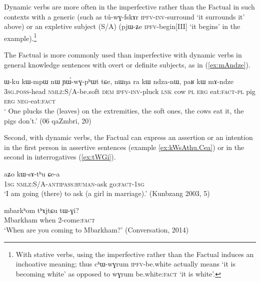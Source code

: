 \documentclass[oldfontcommands,oneside,a4paper,11pt]{article}
\newcommand{\ipa}[1]{{\phon \mbox{#1}}} %
\newcommand{\refb}[1]{(\ref{#1})}
\newcommand{\factual}[1]{\textsc{:fact}}
\begin{document}
 Dynamic verbs are more often in the imperfective rather than the Factual in such contexts with a generic (such as \ipa{tú-wɣ-fskɤr}  \textsc{ipfv-inv}-surround  `it surrounds it' above)  or an expletive subject (S/A) (\ipa{pjɯ-ʑe} \textsc{ipfv}-begin[III] `it begins' in the example).\footnote{With stative verbs, using the imperfective rather than the Factual induces an inchoative meaning; thus \ipa{cʰɯ-wɣrum} \textsc{ipfv}-be.white actually means `it is becoming white' as opposed to \ipa{wɣrum} be.white\factual{} `it is white'.}
 
 The Factual is more commonly used than imperfective with dynamic verbs in general knowledge sentences with overt or definite subjects, as in \refb{ex:mAndze}.  

\begin{exe}
\ex \label{ex:mAndze}
\gll
   	\ipa{ɯ-ku}  	\ipa{kɯ-mpɯ}  	\ipa{nɯ}  	\ipa{ɲɯ́-wɣ-pʰɯt}  	\ipa{tɕe,}  \ipa{nɯŋa}  	\ipa{ra}  	\ipa{kɯ}  	\ipa{ndza-nɯ,}  	\ipa{paʁ}  	\ipa{kɯ}  	\ipa{mɤ-ndze}   \\
\textsc{3sg.poss}-head \textsc{nmlz}:S/A-be.soft \textsc{dem} \textsc{ipfv-inv}-pluck \textsc{lnk} cow \textsc{pl} \textsc{erg} eat:\textsc{fact-pl} pig \textsc{erg} \textsc{neg}-eat\factual{} \\
\glt ` One plucks the (leaves) on the extremities, the soft ones, the cows eat it, the pigs don't.' (06 qaZmbri, 20)
\end{exe}

 
Second, with dynamic verbs, the Factual can express an assertion or an intention in the first person in assertive sentences (example \ref{ex:kWsAthu.Cea}) or in the second in interrogatives (\ref{ex:tWGi}).

\begin{exe}
\ex \label{ex:kWsAthu.Cea}
\gll
\ipa{aʑo}  	\ipa{kɯ-sɤ-tʰu}  	\ipa{ɕe-a}  \\
\textsc{1sg} \textsc{nmlz}:S/A-\textsc{antipass:human}-ask go\factual{}-\textsc{1sg} \\
\glt `I am going (there) to ask (a girl in marriage).' (Kunbzang 2003, 5)
\end{exe}

\begin{exe}
\ex \label{ex:tWGi}
\gll
\ipa{mbarkʰom} \ipa{tʰɤjtɕu} \ipa{tɯ-ɣi}?\\
Mbarkham when 2-come\factual{} \\
\glt `When are you coming to Mbarkham?' (Conversation, 2014)
\end{exe}
\end{document}
